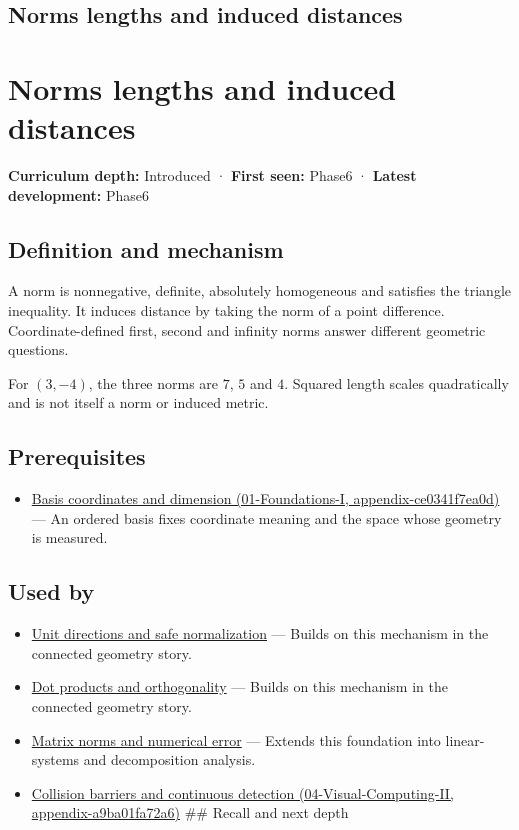 \hypertarget{appendix-49933872bb51}{}
\section*{Norms lengths and induced distances}
\chapter{Norms lengths and induced distances}\label{appendix-49933872bb51-norms-lengths-and-induced-distances}

\textbf{Curriculum depth:} Introduced · \textbf{First seen:} Phase6 · \textbf{Latest development:} Phase6

\section{Definition and mechanism}\label{appendix-49933872bb51-definition-and-mechanism}

A norm is nonnegative, definite, absolutely homogeneous and satisfies the triangle inequality. It induces distance by taking the norm of a point difference. Coordinate-defined first, second and infinity norms answer different geometric questions.

For \((3,-4)\), the three norms are \(7\), \(5\) and \(4\). Squared length scales quadratically and is not itself a norm or induced metric.

\section{Prerequisites}\label{appendix-49933872bb51-prerequisites}

\begin{itemize}
\tightlist
\item
  \href{../01-Foundations-I/main.pdf\#nameddest=appendix-ce0341f7ea0d}{Basis coordinates and dimension (01-Foundations-I, appendix-ce0341f7ea0d)} --- An ordered basis fixes coordinate meaning and the space whose geometry is measured.
\end{itemize}

\section{Used by}\label{appendix-49933872bb51-used-by}

\begin{itemize}
\item
  \hyperref[appendix-f744e41b95b4]{Unit directions and safe normalization} --- Builds on this mechanism in the connected geometry story.
\item
  \hyperref[appendix-8bc4e8fc547c]{Dot products and orthogonality} --- Builds on this mechanism in the connected geometry story.
\item
  \hyperref[appendix-f8657bac66e5]{Matrix norms and numerical error} --- Extends this foundation into linear-systems and decomposition analysis.
\item
  \href{../04-Visual-Computing-II/main.pdf\#nameddest=appendix-a9ba01fa72a6}{Collision barriers and continuous detection (04-Visual-Computing-II, appendix-a9ba01fa72a6)} \#\# Recall and next depth
\end{itemize}

